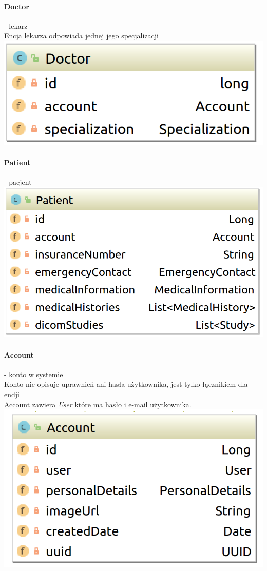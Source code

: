 \documentclass[polish,12pt]{aghthesis}
\begin{document}
    \paragraph{Doctor} - lekarz \\
    Encja lekarza odpowiada jednej jego specjalizacji \\
    \includegraphics[width=\textwidth]{Doctor}
    \paragraph{Patient} - pacjent \\
    \includegraphics[width=\textwidth]{Patient}
    \paragraph{Account} - konto w systemie \\
    Konto nie opisuje uprawnień ani hasła użytkownika, jest tylko łącznikiem dla endji \\
    Account zawiera \emph{User} które ma hasło i e-mail użytkownika.
    \includegraphics[width=\textwidth]{Account}
\end{document}
